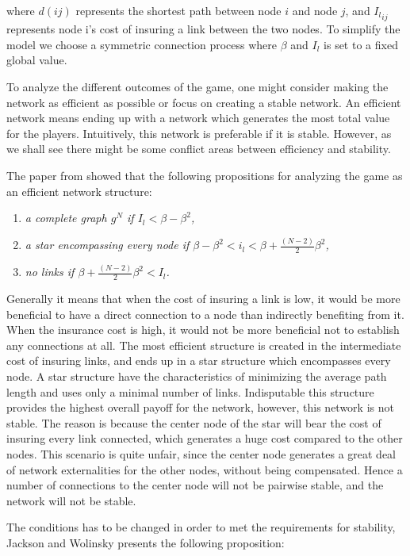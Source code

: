 where $d(ij)$ represents the shortest path between node $i $ and node $j $, and ${I_{l}}_{ij}$ represents node i's cost of insuring a link between the two nodes. To simplify the model we choose a symmetric connection process where $\beta$ and $I_{l}$ is set to a fixed global value. 

To analyze the different outcomes of the game, one might consider making the network as efficient as possible or focus on creating a stable network. An efficient network means ending up with a network which generates the most total value for the players. Intuitively, this network is preferable if it is stable. However, as we shall see there might be some conflict areas between efficiency and stability. 

The paper from \cite{jackson1996strategic} showed that the following propositions for analyzing the game as an efficient network structure:
\begin{enumerate}
\item \textit{a complete graph $g^N$ if $I_{l}<\beta - \beta^2$,}
\item \textit{a star encompassing every node if $\beta - \beta^2 < i_{l} < \beta + \frac{(N-2)}{2}\beta^2$,}
\item \textit{no links if $\beta + \frac{(N-2)}{2}\beta^2 < I_{l}$.}
\end{enumerate}

Generally it means that when the cost of insuring a link is low, it would be more beneficial to have a direct connection to a node than indirectly benefiting from it. When the insurance cost is high, it would not be more beneficial not to establish any connections at all.
The most efficient structure is created in the intermediate cost of insuring links, and ends up in a star structure which encompasses every node. A star structure have the characteristics of minimizing the average path length and uses only a minimal number of links. Indisputable this structure provides the highest overall payoff for the network, however, this network is not stable.
The reason is because the center node of the star will bear the cost of insuring every link connected, which generates a huge cost compared to the other nodes. This scenario is quite unfair, since the center node generates a great deal of network externalities for the other nodes, without being compensated. Hence a number of connections to the center node will not be pairwise stable, and the network will not be stable. 

The conditions has to be changed in order to met the requirements for stability, Jackson and Wolinsky presents the following proposition:

